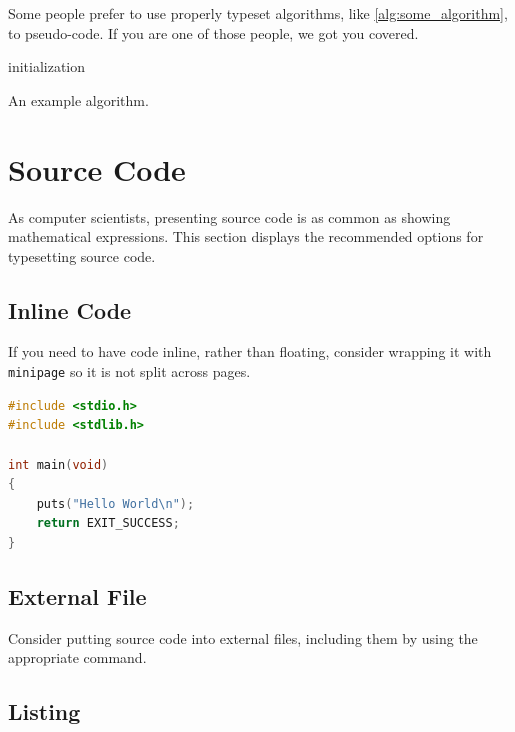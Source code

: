 Some people prefer to use properly typeset algorithms, like \cref{alg:some_algorithm}, to pseudo-code.
If you are one of those people, we got you covered.

\begin{algorithm}
	\capstart
	\BlankLine
	initialization\;
	\caption{An example algorithm.}
	\label{alg:some_algorithm}
\end{algorithm}

\section{Source Code}

As computer scientists, presenting source code is as common as showing mathematical expressions.
This section displays the recommended options for typesetting source code.

\subsection{Inline Code}

If you need to have code inline, rather than floating, consider wrapping it with \texttt{minipage} so it is not split across pages.

\begin{minipage}{0.95\textwidth}
\begin{lstlisting}[language=c]
#include <stdio.h>
#include <stdlib.h>

int main(void)
{
	puts("Hello World\n");
	return EXIT_SUCCESS;
}
\end{lstlisting}
\end{minipage}

\subsection{External File}

Consider putting source code into external files, including them by using the appropriate command.

\begin{minipage}{0.95\textwidth}

\end{minipage}

\subsection{Listing}

